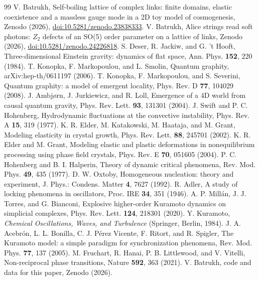 \documentclass[reprint,pre,amsmath,amssymb,superscriptaddress,nofootinbib]{revtex4-2}
\begin{document}
\begin{thebibliography}{99}
 V. Batrukh, Self-boiling lattice of complex links: finite domains, elastic coexistence and a massless gauge mode in a 2D toy model of cosmogenesis, Zenodo (2026), \href{https://doi.org/10.5281/zenodo.23838333}{doi:10.5281/zenodo.23838333}.
 V. Batrukh, Alice strings read soft photons: $Z_2$ defects of an SO(5) order parameter on a lattice of links, Zenodo (2026), \href{https://doi.org/10.5281/zenodo.24226818}{doi:10.5281/zenodo.24226818}.
 S. Deser, R. Jackiw, and G. 't Hooft, Three-dimensional Einstein gravity: dynamics of flat space, Ann. Phys. \textbf{152}, 220 (1984).
 T. Konopka, F. Markopoulou, and L. Smolin, Quantum graphity, arXiv:hep-th/0611197 (2006).
 T. Konopka, F. Markopoulou, and S. Severini, Quantum graphity: a model of emergent locality, Phys. Rev. D \textbf{77}, 104029 (2008).
 J. Ambj{\o}rn, J. Jurkiewicz, and R. Loll, Emergence of a 4D world from causal quantum gravity, Phys. Rev. Lett. \textbf{93}, 131301 (2004).
 J. Swift and P. C. Hohenberg, Hydrodynamic fluctuations at the convective instability, Phys. Rev. A \textbf{15}, 319 (1977).
 K. R. Elder, M. Katakowski, M. Haataja, and M. Grant, Modeling elasticity in crystal growth, Phys. Rev. Lett. \textbf{88}, 245701 (2002).
 K. R. Elder and M. Grant, Modeling elastic and plastic deformations in nonequilibrium processing using phase field crystals, Phys. Rev. E \textbf{70}, 051605 (2004).
 P. C. Hohenberg and B. I. Halperin, Theory of dynamic critical phenomena, Rev. Mod. Phys. \textbf{49}, 435 (1977).
 D. W. Oxtoby, Homogeneous nucleation: theory and experiment, J. Phys.: Condens. Matter \textbf{4}, 7627 (1992).
 R. Adler, A study of locking phenomena in oscillators, Proc. IRE \textbf{34}, 351 (1946).
 A. P. Mill\'an, J. J. Torres, and G. Bianconi, Explosive higher-order Kuramoto dynamics on simplicial complexes, Phys. Rev. Lett. \textbf{124}, 218301 (2020).
 Y. Kuramoto, \emph{Chemical Oscillations, Waves, and Turbulence} (Springer, Berlin, 1984).
 J. A. Acebr\'on, L. L. Bonilla, C. J. P\'erez Vicente, F. Ritort, and R. Spigler, The Kuramoto model: a simple paradigm for synchronization phenomena, Rev. Mod. Phys. \textbf{77}, 137 (2005).
 M. Fruchart, R. Hanai, P. B. Littlewood, and V. Vitelli, Non-reciprocal phase transitions, Nature \textbf{592}, 363 (2021).
 V. Batrukh, code and data for this paper, Zenodo (2026). %
\end{thebibliography}
\end{document}

